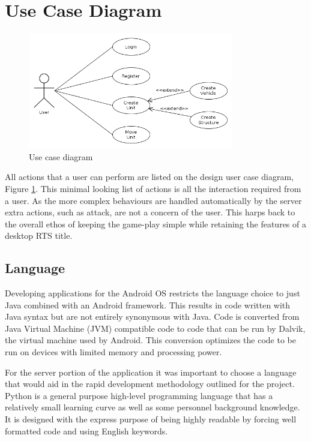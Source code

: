 \section{Use Case Diagram}
\begin{figure}[H]
  \centering
   \includegraphics[width=0.8\textwidth]{Images/diagrams/use.png}
  \caption{Use case diagram}
  \label{fig:use}
\end{figure}

All actions that a user can perform are listed on the design user case diagram, Figure \ref{fig:use}. This minimal looking list of actions is all the interaction required from a user. As the more complex behaviours are handled automatically by the server extra actions, such as attack, are not a concern of the user. This harps back to the overall ethos of keeping the game-play simple while retaining the features of a desktop RTS title.




\subsection{Language}
Developing applications for the Android OS restricts the language choice to just Java combined with an Android framework. This results in code written with Java syntax but are not entirely synonymous with Java. Code is converted from Java Virtual Machine (JVM) compatible code to code that can be run by Dalvik, the virtual machine used by Android. This conversion optimizes the code to be run on devices with limited memory and processing power.

For the server portion of the application it was important to choose a language that would aid in the rapid development methodology outlined for the project. Python is a general purpose high-level programming language that has a relatively small learning curve as well as some personnel background knowledge. It is designed with the express purpose of being highly readable by forcing well formatted code and using English keywords. 

